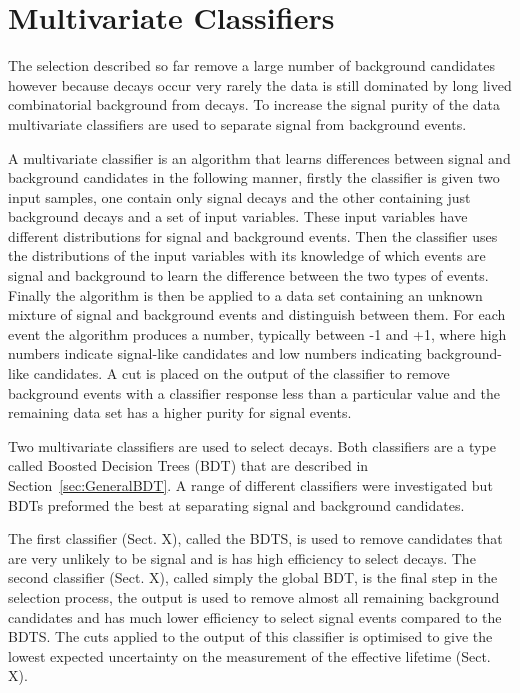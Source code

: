 \section{Multivariate Classifiers}
\label{sec:MVC}

The selection described so far remove a large number of background candidates however because \bsmumu decays occur very rarely the data is still dominated by long lived combinatorial background from \bbbarmumux decays. To increase the signal purity of the data multivariate classifiers are used to separate signal from background events. 

A multivariate classifier is an algorithm that learns differences between signal and background candidates in the following manner, firstly the classifier is given two input samples, one contain only signal decays and the other containing just background decays and a set of input variables. These input variables have different distributions for signal and background events. Then the classifier uses the distributions of the input variables with its knowledge of which events are signal and background to learn the difference between the two types of events. Finally the algorithm is then be applied to a data set containing an unknown mixture of signal and background events and distinguish between them. For each event the algorithm produces a number, typically between -1 and +1, where high numbers indicate signal-like candidates and low numbers indicating background-like candidates. A cut is placed on the output of the classifier to remove background events with a classifier response less than a particular value and the remaining data set has a higher purity for signal events.

Two multivariate classifiers are used to select \bsmumu decays. Both classifiers are a type called Boosted Decision Trees (BDT) that are described in Section~\ref{sec:GeneralBDT}. A range of different classifiers were investigated but BDTs preformed the best at separating signal and background candidates. 

The first classifier (Sect. X), called the BDTS, is used to remove candidates that are very unlikely to be signal and is has  high efficiency to select \bsmumu decays. The second classifier (Sect. X), called simply the global BDT, is the final step in the selection process, the output is used to remove almost all remaining background candidates and has much lower efficiency to select signal events compared to the BDTS. The cuts applied to the output of this classifier is optimised to give the lowest expected uncertainty on the measurement of the \bsmumu effective lifetime (Sect. X).

